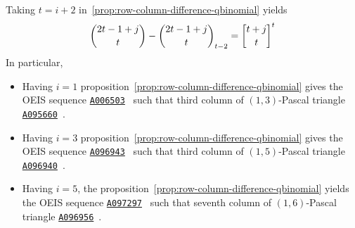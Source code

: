 Taking $t=i+2$ in~\eqref{prop:row-column-difference-qbinomial} yields
\begin{align*}
    \binom{2t-1+j}{t} - \rascalNumber{2t-1+j}{t}{t-2} = \oneQBinomial{t+j}{t}{t}
\end{align*}
In particular,
\begin{itemize}
    \item Having $i=1$ proposition~\eqref{prop:row-column-difference-qbinomial}
    gives the OEIS sequence \href{https://oeis.org/A006503}{\texttt{A006503}}~\cite{sloane1995n}
    such that third column of $(1,3)$-Pascal triangle
    \href{https://oeis.org/A095660}{\texttt{A095660}}~\cite{sloane2004pascal13}.
    \item Having $i=3$ proposition~\eqref{prop:row-column-difference-qbinomial}
    gives the OEIS sequence \href{https://oeis.org/A096943}{\texttt{A096943}}~\cite{sloane2004sixth}
    such that third column of $(1,5)$-Pascal triangle
    \href{https://oeis.org/A096940}{\texttt{A096940}}~\cite{sloane2004pascal}.
    \item Having $i=5$, the proposition~\eqref{prop:row-column-difference-qbinomial} yields
    the OEIS sequence \href{https://oeis.org/A097297}{\texttt{A097297}}~\cite{sloane2004seventh}
    such that seventh column of $(1,6)$-Pascal triangle
    \href{https://oeis.org/A096956}{\texttt{A096956}}~\cite{sloane2004pascal16}.
\end{itemize}
